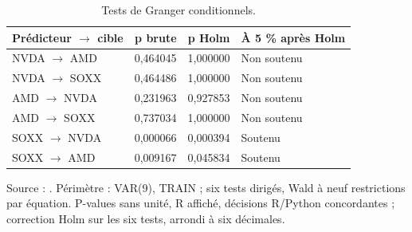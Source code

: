 \begin{table}[!htbp]
\centering
\caption{Tests de Granger conditionnels.}
\label{tab:granger}
\small
\setlength{\tabcolsep}{4pt}
\renewcommand{\arraystretch}{1.16}
\begin{tabularx}{\linewidth}{XrrX}
\toprule
\textbf{Prédicteur \(\rightarrow\) cible} & \textbf{p brute} & \textbf{p Holm} & \textbf{À 5 \% après Holm} \\
\midrule
NVDA \(\rightarrow\) AMD & 0,464045 & 1,000000 & Non soutenu \\
NVDA \(\rightarrow\) SOXX & 0,464486 & 1,000000 & Non soutenu \\
AMD \(\rightarrow\) NVDA & 0,231963 & 0,927853 & Non soutenu \\
AMD \(\rightarrow\) SOXX & 0,737034 & 1,000000 & Non soutenu \\
SOXX \(\rightarrow\) NVDA & 0,000066 & 0,000394 & Soutenu \\
SOXX \(\rightarrow\) AMD & 0,009167 & 0,045834 & Soutenu \\
\bottomrule
\end{tabularx}
\par\smallskip
\begin{minipage}{\linewidth}\footnotesize Source : . Périmètre : VAR(9), TRAIN ; six tests dirigés, Wald à neuf restrictions par équation. P-values sans unité, R affiché, décisions R/Python concordantes ; correction Holm sur les six tests, arrondi à six décimales.
\end{minipage}
\end{table}
